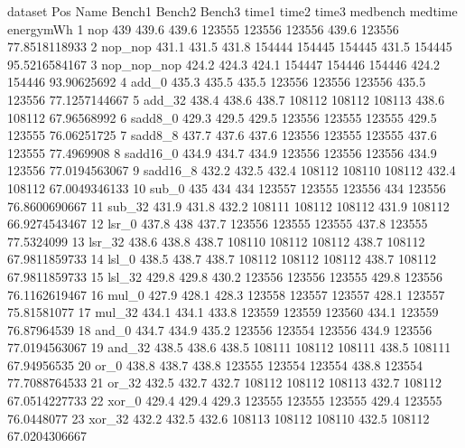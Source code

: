 \begin{filecontents}{dataset}
Pos	Name	Bench1	Bench2	Bench3	time1	time2	time3	medbench	medtime	energymWh
1	nop	439	439.6	439.6	123555	123556	123556	439.6	123556	77.8518118933
2	nop\_nop	431.1	431.5	431.8	154444	154445	154445	431.5	154445	95.5216584167
3	nop\_nop\_nop	424.2	424.3	424.1	154447	154446	154446	424.2	154446	93.90625692
4	add\_0	435.3	435.5	435.5	123556	123556	123556	435.5	123556	77.1257144667
5	add\_32	438.4	438.6	438.7	108112	108112	108113	438.6	108112	67.96568992
6	sadd8\_0	429.3	429.5	429.5	123556	123555	123555	429.5	123555	76.06251725
7	sadd8\_8	437.7	437.6	437.6	123556	123555	123555	437.6	123555	77.4969908
8	sadd16\_0	434.9	434.7	434.9	123556	123556	123556	434.9	123556	77.0194563067
9	sadd16\_8	432.2	432.5	432.4	108112	108110	108112	432.4	108112	67.0049346133
10	sub\_0	435	434	434	123557	123555	123556	434	123556	76.8600690667
11	sub\_32	431.9	431.8	432.2	108111	108112	108112	431.9	108112	66.9274543467
12	lsr\_0	437.8	438	437.7	123556	123555	123555	437.8	123555	77.5324099
13	lsr\_32	438.6	438.8	438.7	108110	108112	108112	438.7	108112	67.9811859733
14	lsl\_0	438.5	438.7	438.7	108112	108112	108112	438.7	108112	67.9811859733
15	lsl\_32	429.8	429.8	430.2	123556	123556	123555	429.8	123556	76.1162619467
16	mul\_0	427.9	428.1	428.3	123558	123557	123557	428.1	123557	75.81581077
17	mul\_32	434.1	434.1	433.8	123559	123559	123560	434.1	123559	76.87964539
18	and\_0	434.7	434.9	435.2	123556	123554	123556	434.9	123556	77.0194563067
19	and\_32	438.5	438.6	438.5	108111	108112	108111	438.5	108111	67.94956535
20	or\_0	438.8	438.7	438.8	123555	123554	123554	438.8	123554	77.7088764533
21	or\_32	432.5	432.7	432.7	108112	108112	108113	432.7	108112	67.0514227733
22	xor\_0	429.4	429.4	429.3	123555	123555	123555	429.4	123555	76.0448077
23	xor\_32	432.2	432.5	432.6	108113	108112	108110	432.5	108112	67.0204306667
\end{filecontents}


